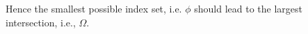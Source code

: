 \documentclass[preview]{standalone}
\begin{document}
\begin{center}
Hence the smallest possible index set, i.e. $\phi$ should lead to the largest intersection, i.e., $\Omega$.
\end{center}
\end{document}
